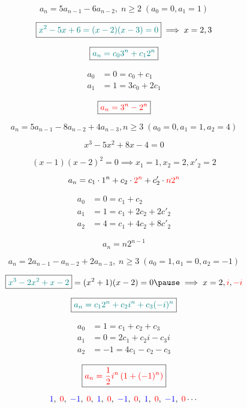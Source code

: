 \begin{frame}{}
  \[
    a_n = 5a_{n-1} - 6a_{n-2},\; n \ge 2 \; (a_0 = 0, a_1 = 1)
  \]

  \pause
  \[
    \boxed{\textcolor{teal}{x^2 - 5x + 6 = (x-2) (x-3) = 0}} \implies x = 2, 3
  \]

  \pause
  \[
    \boxed{\textcolor{teal}{a_n = c_0 3^n + c_1 2^n}}
  \]
  
  \pause
  \begin{align*}
    a_0 &= 0 = c_0 + c_1 \\
    a_1 &= 1 = 3c_0 + 2c_1
  \end{align*}

  \pause
  \[
    \boxed{\textcolor{red}{a_n = 3^n - 2^n}}
  \]
\end{frame}

\begin{frame}{}
  \[
    a_n = 5 a_{n-1} - 8 a_{n-2} + 4 a_{n-3}, n \ge 3 \; (a_0 = 0, a_1 = 1, a_2 = 4)
  \]

  \pause
  \[
    \boxed{x^3 - 5 x^2 + 8 x - 4 = 0}
  \]

  \pause
  \[
    (x-1) (x-2)^2 = 0 \implies x_1 = 1, x_{2} = 2, x'_{2} = 2
  \]

  \pause
  \[
    a_n = c_1 \cdot 1^{n} + c_{2} \cdot \textcolor{red}{2^{n}} + c'_{2} \cdot \textcolor{red}{n 2^{n}}
  \]

  \pause
  \vspace{-0.30cm}
  \begin{align*}
    a_0 &= 0 = c_1 + c_2 \\
    a_1 &= 1 = c_1 + 2c_2 + 2c'_{2} \\
    a_2 &= 4 = c_1 + 4c_2 + 8c'_{2}
  \end{align*}

  \pause
  \[
    \boxed{a_n = n 2^{n-1}}
  \]
\end{frame}

\begin{frame}{}
  \[
    a_n = 2a_{n-1} - a_{n-2} + 2a_{n-3},\; n \ge 3 \; (a_0 = 1, a_1 = 0, a_2 = -1)
  \]

  \pause
  \[
    \boxed{\teal{x^3 - 2x^2 + x - 2}} = (x^2 + 1) (x-2) = 0 \pause \implies x = 2, \red{i}, \red{-i}
  \]

  \pause
  \[
    \boxed{\textcolor{teal}{a_n = c_1 2^n + c_2 i^n + c_3 (-i)^n}}
  \]

  \pause
  \vspace{-0.50cm}
  \begin{align*}
    a_0 &= 1 = c_1 + c_2 + c_3 \\
    a_1 &= 0 = 2c_1 + c_2 i - c_3 i \\
    a_2 &= -1 = 4c_1 - c_2 - c_3
  \end{align*}

  \pause
  \vspace{-0.30cm}
  \[
    \boxed{\textcolor{red}{a_n = \frac{1}{2} i^{n} \left(1 + (-1)^n \right)}}
  \]

  \pause
  \[
    \textcolor{blue}{1},\; \textcolor{red}{0},\; \textcolor{blue}{-1},\; \textcolor{red}{0},\; \textcolor{blue}{1},\; \textcolor{red}{0},\; \textcolor{blue}{-1},\; \textcolor{red}{0},\;
    \textcolor{blue}{1},\; \textcolor{red}{0},\; \textcolor{blue}{-1},\; \textcolor{red}{0} \cdots
  \]
\end{frame}

